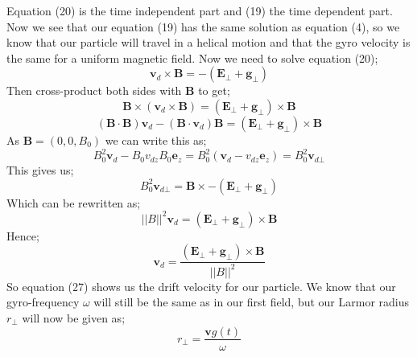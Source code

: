 \documentclass[14paper,11pt,hidelinks]{article}
\begin{document}
Equation (20) is the time independent part and (19) the time dependent part. Now we see that our equation (19) has the same solution as equation (4), so we know that our particle will travel in a helical motion and that the gyro velocity is the same for a uniform magnetic field. Now we need to solve equation (20);
\begin{equation}
\mathbf{v}_d\times\mathbf{B}=-\left(\mathbf{E}_\bot+\mathbf{g}_\bot\right)
\end{equation}
Then cross-product both sides with \textbf{B} to get;
\begin{equation}
\mathbf{B}\times\left(\mathbf{v}_d\times\mathbf{B}\right)=\left(\mathbf{E}_\bot+\mathbf{g}_\bot\right)\times\mathbf{B}
\end{equation}
\begin{equation}
\left(\mathbf{B}\cdot\mathbf{B}\right)\mathbf{v}_d-\left(\mathbf{B}\cdot\mathbf{v}_d\right)\mathbf{B}=\left(\mathbf{E}_\bot+\mathbf{g}_\bot\right)\times\mathbf{B}
\end{equation}
As \begin{math}\mathbf{B}=\left(0,0,B_0\right)\end{math} we can write this as;
\begin{equation}
B_0^2\mathbf{v}_d-B_0v_{dz}B_0\mathbf{e}_z=B_0^2\left(\mathbf{v}_d-v_{dz}\mathbf{e}_z\right)=B_0^2\mathbf{v}_{d\bot}
\end{equation}
This gives us;
\begin{equation}
B_0^2\mathbf{v}_{d\bot}=\mathbf{B}\times-\left(\mathbf{E}_\bot+\mathbf{g}_\bot\right)
\end{equation}
Which can be rewritten as;
\begin{equation}
||B||^2\mathbf{v}_d=\left(\mathbf{E}_\bot+\mathbf{g}_\bot\right)\times\mathbf{B}
\end{equation}
Hence;
\begin{equation}
\mathbf{v}_d=\frac{\left(\mathbf{E}_\bot+\mathbf{g}_\bot\right)\times\mathbf{B}}{||B||^2}
\end{equation}
So equation (27) shows us the drift velocity for our particle.
We know that our gyro-frequency \begin{math} \omega \end{math} will still be the same as in our first field, but our Larmor radius \begin{math} r_\bot \end{math} will now be given as;
\begin{equation}
r_\bot=\frac{\mathbf{v}g(t)}{\omega}
\end{equation}
\end{document}
